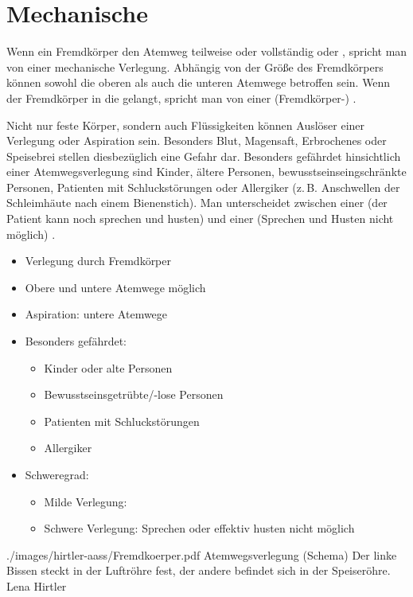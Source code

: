 




\clearpage %
\section{Mechanische }
\label{topic:mechanische-atemwegsverlegung}
\label{topic:fremdkoerperaspiration}


\TextSlideTeaser
{\TxBeschreibung}%
{%
%
Wenn ein Fremdkörper den Atemweg teilweise oder vollständig 
 oder , spricht man von einer
mechanische Verlegung. Abhängig von der Größe des
Fremdkörpers können sowohl die oberen als auch die unteren
Atemwege betroffen sein. Wenn der Fremdkörper in die
 gelangt, spricht man von einer
(Fremdkörper-) .

Nicht nur feste Körper, sondern auch Flüssigkeiten können
Auslöser einer Verlegung oder Aspiration sein. Besonders
Blut, Magensaft, Erbrochenes oder Speisebrei stellen
diesbezüglich eine Gefahr dar.
Besonders gefährdet hinsichtlich einer Atemwegsverlegung sind
Kinder, ältere Personen, bewusstseinseingschränkte Personen,
Patienten mit Schluckstörungen oder Allergiker (z.\,B.
Anschwellen der Schleimhäute nach einem Bienenstich).
Man unterscheidet zwischen einer  (der Patient
kann noch sprechen und husten) und einer
 (Sprechen und Husten nicht
möglich) \citep{Erc2005Sec2,Erc2005Sec6,Erc2005DeSec2,Erc2005DeSec6}.}%
{%
\begin{itemize}
  \item Verlegung durch Fremdkörper
  \item Obere und untere Atemwege möglich
  \item Aspiration: untere Atemwege
  \item Besonders gefährdet:
  \begin{itemize}
    \item Kinder oder alte Personen
    \item Bewusstseinsgetrübte/-lose Personen
    \item Patienten mit Schluckstörungen
    \item Allergiker
  \end{itemize}
  \item Schweregrad:
  \begin{itemize}
    \item Milde Verlegung: 
    \item Schwere Verlegung: Sprechen oder
    effektiv husten nicht möglich
  \end{itemize}
\end{itemize}
}%
{./images/hirtler-aass/Fremdkoerper.pdf}%
{Atemwegsverlegung (Schema)}%
{Der linke Bissen steckt in der Luftröhre fest, der
andere befindet sich in der Speiseröhre.}%
{Lena Hirtler}%
{}%


